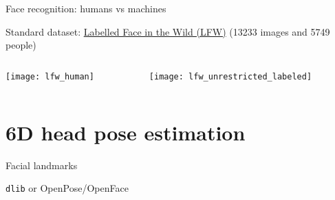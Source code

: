\documentclass[compress]{beamer}
\makeatletter
\let\beamer@writeslidentry@miniframeson=\beamer@writeslidentry
\def\beamer@writeslidentry@miniframesoff{%
  \expandafter\beamer@ifempty\expandafter{\beamer@framestartpage}{}%
  {%
    \clearpage\beamer@notesactions%
  }
}
\newcommand*{\miniframeson}{\let\beamer@writeslidentry=\beamer@writeslidentry@miniframeson}
\newcommand*{\miniframesoff}{\let\beamer@writeslidentry=\beamer@writeslidentry@miniframesoff}
\newcommand{\source}[2]{{\tiny\it Source: \href{#1}{#2}}}
\makeatother
\begin{document}
\begin{frame}{Face recognition: humans vs machines}

    Standard dataset:
    \href{http://vis-www.cs.umass.edu/lfw/results.html}{Labelled Face in the
    Wild (LFW)} (13233 images and 5749 people)

    \begin{columns}
        \begin{column}{0.5\linewidth}
            \begin{center}
                \texttt{[image: lfw\_human]}
            \end{center}
        \end{column}
        \begin{column}{0.5\linewidth}
            \begin{center}
                \texttt{[image: lfw\_unrestricted\_labeled]}
            \end{center}
        \end{column}
    \end{columns}

\end{frame}



%
%




\section[Head pose]{6D head pose estimation}

{
\begin{frame}{Facial landmarks}
    \begin{center}

        \begin{center}
        {\tt dlib} or OpenPose/OpenFace
        \end{center}

    \end{center}
\end{frame}
}
\end{document}
